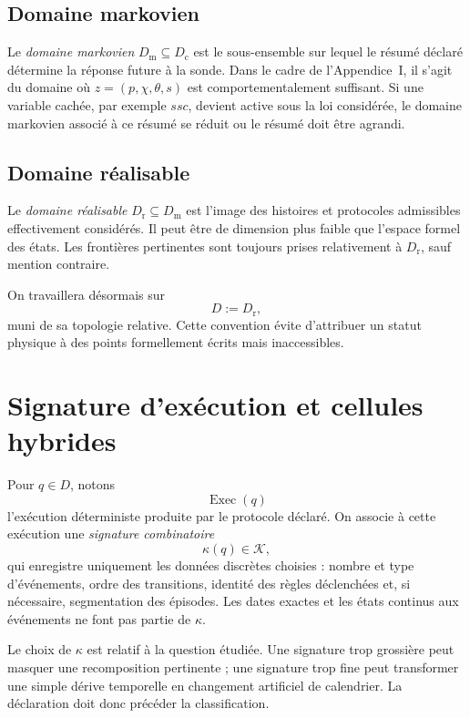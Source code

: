 \subsection{Domaine markovien}

Le \emph{domaine markovien} $D_{\mathrm m}\subseteq D_{\mathrm c}$ est le
sous-ensemble sur lequel le résumé déclaré détermine la réponse future à
la sonde. Dans le cadre de l'Appendice~I, il s'agit du domaine où
$z=(p,\chi,\theta,s)$ est comportementalement suffisant. Si une variable
cachée, par exemple $ssc$, devient active sous la loi considérée, le
domaine markovien associé à ce résumé se réduit ou le résumé doit être
agrandi.

\subsection{Domaine réalisable}

Le \emph{domaine réalisable} $D_{\mathrm r}\subseteq D_{\mathrm m}$ est
l'image des histoires et protocoles admissibles effectivement considérés.
Il peut être de dimension plus faible que l'espace formel des états. Les
frontières pertinentes sont toujours prises relativement à
$D_{\mathrm r}$, sauf mention contraire.

On travaillera désormais sur
\[
D:=D_{\mathrm r},
\]
muni de sa topologie relative. Cette convention évite d'attribuer un
statut physique à des points formellement écrits mais inaccessibles.

\section{Signature d'exécution et cellules hybrides}
\label{annexe-J-signature}

Pour $q\in D$, notons
\[
\operatorname{Exec}(q)
\]
l'exécution déterministe produite par le protocole déclaré. On associe à
cette exécution une \emph{signature combinatoire}
\[
\kappa(q)\in\mathcal K,
\]
qui enregistre uniquement les données discrètes choisies : nombre et
type d'événements, ordre des transitions, identité des règles déclenchées
et, si nécessaire, segmentation des épisodes. Les dates exactes et les
états continus aux événements ne font pas partie de $\kappa$.

Le choix de $\kappa$ est relatif à la question étudiée. Une signature
trop grossière peut masquer une recomposition pertinente ; une signature
trop fine peut transformer une simple dérive temporelle en changement
artificiel de calendrier. La déclaration doit donc précéder la
classification.

